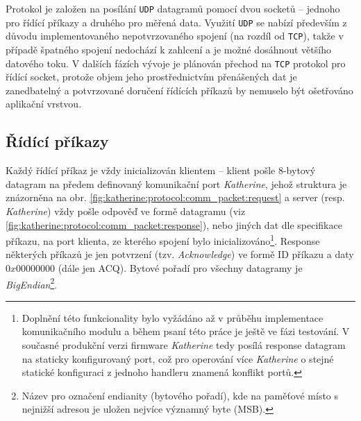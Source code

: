 Protokol je založen na posílání \texttt{UDP} datagramů pomocí dvou socketů -- jednoho pro řídící příkazy a druhého pro měřená data. Využití \texttt{UDP} se nabízí především z důvodu implementovaného nepotvrzovaného spojení (na rozdíl od \texttt{TCP}), takže v případě špatného spojení nedochází k zahlcení a je možné dosáhnout většího datového toku. V dalších fázích vývoje je plánován přechod na \texttt{TCP} protokol pro řídící socket, protože objem jeho prostřednictvím přenášených dat je zanedbatelný a potvrzované doručení řídících příkazů by nemuselo být ošetřováno aplikační vrstvou.

\subsection{Řídící příkazy}\label{chap:katherine:protocol:control_commands}
Každý řídící příkaz je vždy inicializován klientem -- klient pošle 8-bytový datagram na předem definovaný komunikační port \textit{Katherine}, jehož struktura je znázorněna na obr. \ref{fig:katherine:protocol:comm_packet:request} a server (resp. \textit{Katherine}) vždy pošle odpověď ve formě datagramu (viz \ref{fig:katherine:protocol:comm_packet:response}), nebo jiných dat dle specifikace příkazu, na port klienta, ze kterého spojení bylo inicializováno\footnote{Doplnění této funkcionality bylo vyžádáno až v průběhu implementace komunikačního modulu a během psaní této práce je ještě ve fázi testování. V současné produkční verzi firmware \textit{Katherine} tedy posílá response datagram na staticky konfigurovaný port, což pro operování více \textit{Katherine} o stejné statické konfiguraci z jednoho handleru znamená konflikt portů.}. Response některých příkazů je jen potvrzení (tzv. \textit{Acknowledge}) ve formě ID příkazu a daty $0x00000000$ (dále jen ACQ). Bytové pořadí pro všechny datagramy je \textit{BigEndian}\footnote{Název pro označení endianity (bytového pořadí), kde na paměťové místo s nejnižší adresou je uložen nejvíce významný byte (MSB).}.


